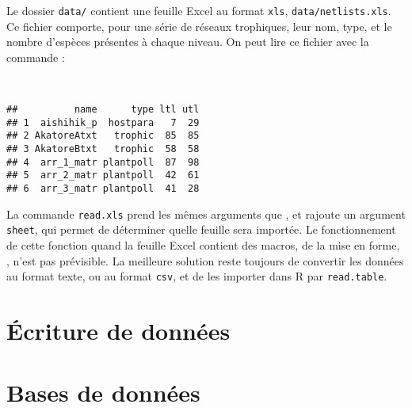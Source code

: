 Le dossier \texttt{data/} contient une feuille Excel au format \texttt{xls}, \texttt{data/netlists.xls}. Ce fichier comporte, pour une série de réseaux trophiques, leur nom, type, et le nombre d'espèces présentes à chaque niveau.
On peut lire ce fichier avec la commande :

\begin{knitrout}
\color{fgcolor}\begin{kframe}
\begin{flushleft}
\ttfamily\noindent
{}\hlassignement{\usebox{\hlnormalsizeboxlessthan}-}{\ }\hlkeyword{(}\hlkeyword{,}{\ }\hlargument{=}{\ }\hlkeyword{,}{\ }\hlargument{=}{\ }\hlkeyword{)}\hspace*{\fill}\\
\hlstd{}\hlkeyword{(}\hlkeyword{)}\mbox{}
\normalfont
\end{flushleft}
\begin{verbatim}
##          name      type ltl utl
## 1  aishihik_p  hostpara   7  29
## 2 AkatoreAtxt   trophic  85  85
## 3 AkatoreBtxt   trophic  58  58
## 4  arr_1_matr plantpoll  87  98
## 5  arr_2_matr plantpoll  42  61
## 6  arr_3_matr plantpoll  41  28
\end{verbatim}
\end{kframe}
\end{knitrout}


\noindent La commande \texttt{read.xls} prend les mêmes arguments que , et rajoute un argument \texttt{sheet}, qui permet de déterminer quelle feuille sera importée.
Le fonctionnement de cette fonction quand la feuille Excel contient des macros, de la mise en forme, , n'est pas prévisible.
La meilleure solution reste toujours de convertir les données au format texte, ou au format \texttt{csv}, et de les importer dans R par \texttt{read.table}. 

\section{Écriture de données}

\section{Bases de données}
